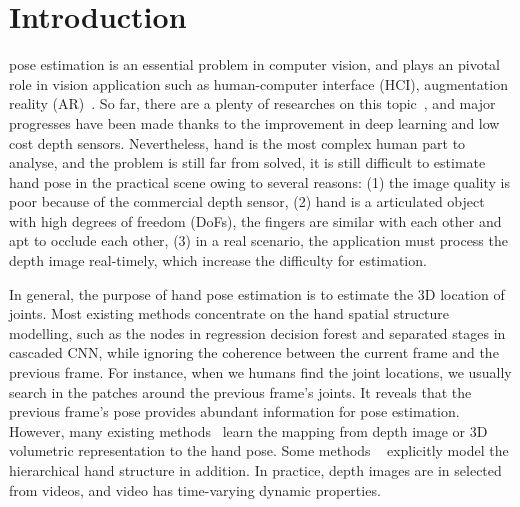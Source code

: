 \documentclass[journal,comsoc]{IEEEtran}
\begin{document}
\section{Introduction}\label{sec:introduction}
 pose estimation is an essential problem in computer vision, and plays an pivotal
role in vision application such as human-computer interface (HCI), augmentation reality (AR)~\cite{barsoum2016articulated}. So
far, there are a plenty of researches on this topic~\cite{guo2017region, quach2016depth, ge2017_3D,
wan2017crossing}, and major progresses have been made thanks to the improvement in deep learning
and low cost depth sensors. Nevertheless, hand is the most complex human part to analyse, and the
problem is still far from solved, it is still difficult to estimate hand pose in the practical scene
owing to several reasons: (1) the image quality is poor because of the commercial depth sensor, (2)
hand is a articulated object with high degrees of freedom (DoFs), the fingers are similar with each
other and apt to occlude each other, (3) in a real scenario, the application must process the depth
image real-timely, which increase the difficulty for estimation.

In general, the purpose of hand pose estimation is to estimate the 3D location of joints. Most existing
methods concentrate on the hand spatial structure modelling, such as the nodes in regression decision
forest and separated stages in cascaded CNN, while ignoring the coherence between the current frame and
the previous frame. For instance, when we humans find the joint locations, we usually search in the
patches around the previous frame's joints. It reveals that the previous frame's pose provides abundant
information for pose estimation. However, many existing methods~\cite{oberweger2015hands, ge2017_3D} learn
the mapping from depth image or 3D volumetric representation to the hand pose. Some methods
~\cite{sun2015cascaded, ye2016spatial} explicitly model the hierarchical hand structure in addition. In
practice, depth images are in selected from videos, and video has time-varying dynamic properties.
\end{document}
